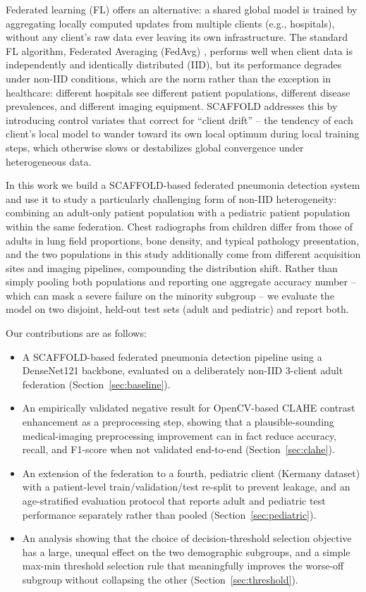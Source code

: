 \documentclass[conference]{IEEEtran}
\begin{document}
Federated learning (FL) offers an alternative: a shared global model is
trained by aggregating locally computed updates from multiple clients (e.g.,
hospitals), without any client's raw data ever leaving its own
infrastructure. The standard FL algorithm, Federated Averaging (FedAvg)
\cite{mcmahan2017fedavg}, performs well when client data is independently
and identically distributed (IID), but its performance degrades under
non-IID conditions, which are the norm rather than the exception in
healthcare: different hospitals see different patient populations, different
disease prevalences, and different imaging equipment. SCAFFOLD
\cite{karimireddy2020scaffold} addresses this by introducing control
variates that correct for ``client drift'' -- the tendency of each client's
local model to wander toward its own local optimum during local training
steps, which otherwise slows or destabilizes global convergence under
heterogeneous data.

In this work we build a SCAFFOLD-based federated pneumonia detection system
and use it to study a particularly challenging form of non-IID
heterogeneity: combining an adult-only patient population with a pediatric
patient population within the same federation. Chest radiographs from
children differ from those of adults in lung field proportions, bone
density, and typical pathology presentation, and the two populations in this
study additionally come from different acquisition sites and imaging
pipelines, compounding the distribution shift. Rather than simply pooling
both populations and reporting one aggregate accuracy number -- which can
mask a severe failure on the minority subgroup -- we evaluate the model on
two disjoint, held-out test sets (adult and pediatric) and report both.

Our contributions are as follows:
\begin{itemize}
    \item A SCAFFOLD-based federated pneumonia detection pipeline using a
    DenseNet121 backbone, evaluated on a deliberately non-IID 3-client adult
    federation (Section~\ref{sec:baseline}).
    \item An empirically validated negative result for OpenCV-based CLAHE
    contrast enhancement as a preprocessing step, showing that a
    plausible-sounding medical-imaging preprocessing improvement can in fact
    reduce accuracy, recall, and F1-score when not validated end-to-end
    (Section~\ref{sec:clahe}).
    \item An extension of the federation to a fourth, pediatric client
    (Kermany dataset) with a patient-level train/validation/test re-split to
    prevent leakage, and an age-stratified evaluation protocol that reports
    adult and pediatric test performance separately rather than pooled
    (Section~\ref{sec:pediatric}).
    \item An analysis showing that the choice of decision-threshold
    selection objective has a large, unequal effect on the two
    demographic subgroups, and a simple max-min threshold selection rule
    that meaningfully improves the worse-off subgroup without collapsing
    the other (Section~\ref{sec:threshold}).
\end{itemize}
\end{document}
